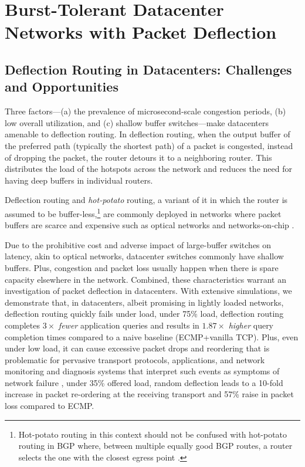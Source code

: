 \chapter{Burst-Tolerant Datacenter Networks with Packet Deflection} \label{chap:chap-4}




\section{Deflection Routing in Datacenters: Challenges and Opportunities}
\label{sec:deflection}
Three factors---(a) the prevalence of microsecond-scale congestion periods, (b) low overall utilization, and (c) shallow buffer switches---make datacenters amenable to deflection routing. In deflection routing, when the output buffer of the preferred path (typically the shortest path) of a packet is congested, instead of dropping the packet, the router detours it to a neighboring router. This distributes the load of the hotspots across the network and reduces the need for having deep buffers in individual routers. 

Deflection routing and \emph{hot-potato} routing, a variant of it in which the router is assumed to be buffer-less,\footnote{Hot-potato routing in this context should not be confused with hot-potato routing in BGP where, between multiple equally good BGP routes, a router selects the one with the closest egress point \cite{teixeira2004dynamics}.} are commonly deployed in networks where packet buffers are scarce and expensive such as optical networks \cite{defl1, defl2, defl3, defl4, defl5, defl6, defl7} and networks-on-chip \cite{fallin2012minbd, lu2006evaluation}. 

Due to the prohibitive cost and adverse impact of large-buffer switches on latency, akin to optical networks, datacenter switches commonly have shallow buffers. Plus, congestion and packet loss usually happen when there is spare capacity elsewhere in the network. Combined, these characteristics warrant an investigation of packet deflection in datacenters. With extensive simulations, we demonstrate that, in datacenters, albeit promising in lightly loaded networks, deflection routing quickly fails under load, \eg under 75\% load, deflection routing completes $3\times$ \emph{fewer} application queries and results in $1.87\times$ \emph{higher} query completion times compared to a naive baseline (ECMP+vanilla TCP). Plus, even under low load, it can cause excessive packet drops and reordering that is problematic for pervasive transport protocols, applications, and network monitoring and diagnosis systems that interpret such events as symptoms of network failure \cite{007,blame,netseer}, \eg under 35\% offered load, random deflection leads to a 10-fold increase in packet re-ordering at the receiving transport and 57\% raise in packet loss compared to ECMP.


